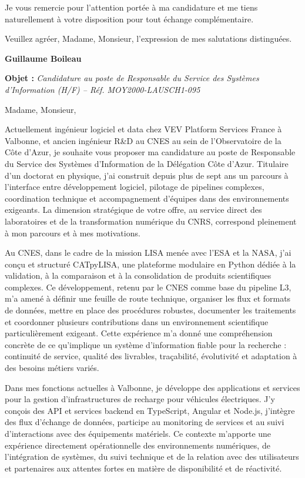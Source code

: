\documentclass[10pt,a4paper]{../_shared/altacv}
\begin{document}
Je vous remercie pour l’attention portée à ma candidature et me tiens naturellement à votre disposition pour tout échange complémentaire.

Veuillez agréer, Madame, Monsieur, l’expression de mes salutations distinguées.

\textbf{Guillaume Boileau}


\fi

{\color{accent}\textbf{Objet :}} \textit{Candidature au poste de Responsable du Service des Systèmes d'Information (H/F) -- Réf. MOY2000-LAUSCH1-095}

\vspace{0.4cm}

{\color{body}

Madame, Monsieur,

Actuellement ingénieur logiciel et data chez VEV Platform Services France à Valbonne, et ancien ingénieur R\&D au CNES au sein de l’Observatoire de la Côte d’Azur, je souhaite vous proposer ma candidature au poste de Responsable du Service des Systèmes d’Information de la Délégation Côte d’Azur. Titulaire d’un doctorat en physique, j’ai construit depuis plus de sept ans un parcours à l’interface entre développement logiciel, pilotage de pipelines complexes, coordination technique et accompagnement d’équipes dans des environnements exigeants. La dimension stratégique de votre offre, au service direct des laboratoires et de la transformation numérique du CNRS, correspond pleinement à mon parcours et à mes motivations.

Au CNES, dans le cadre de la mission LISA menée avec l’ESA et la NASA, j’ai conçu et structuré CATpyLISA, une plateforme modulaire en Python dédiée à la validation, à la comparaison et à la consolidation de produits scientifiques complexes. Ce développement, retenu par le CNES comme base du pipeline L3, m’a amené à définir une feuille de route technique, organiser les flux et formats de données, mettre en place des procédures robustes, documenter les traitements et coordonner plusieurs contributions dans un environnement scientifique particulièrement exigeant. Cette expérience m’a donné une compréhension concrète de ce qu’implique un système d’information fiable pour la recherche : continuité de service, qualité des livrables, traçabilité, évolutivité et adaptation à des besoins métiers variés.

Dans mes fonctions actuelles à Valbonne, je développe des applications et services pour la gestion d’infrastructures de recharge pour véhicules électriques. J’y conçois des API et services backend en TypeScript, Angular et Node.js, j’intègre des flux d’échange de données, participe au monitoring de services et au suivi d’interactions avec des équipements matériels. Ce contexte m’apporte une expérience directement opérationnelle des environnements numériques, de l’intégration de systèmes, du suivi technique et de la relation avec des utilisateurs et partenaires aux attentes fortes en matière de disponibilité et de réactivité.

}
\end{document}

